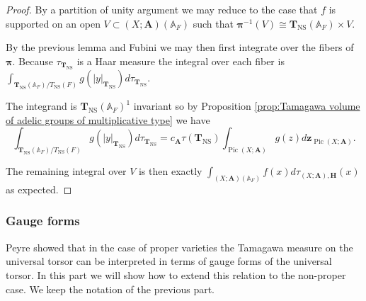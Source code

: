 \documentclass[a4paper,11pt,reqno]{amsart}
\newcommand{\A}{\mathbb{A}}
\DeclareMathOperator{\Pic}{Pic}
\DeclareMathOperator{\NS}{NS}
\theoremstyle{definition}
\begin{document}
\begin{proof}
	By a partition of unity argument we may reduce to the case that $f$ is supported on an open $V \subset (X ; \mathbf{A})(\A_F)$ such that $\bm{\pi}^{-1}(V) \cong \mathbf{T}_{\NS}(\A_F) \times V$. 
	
	By the previous lemma and Fubini we may then first integrate over the fibers of $\bm{\pi}$. Because $\tau_{\mathbf{T}_{\NS}}$ is a Haar measure the integral over each fiber is $\int_{\mathbf{T}_{\NS}(\A_F)/ T_{\NS}(F)} g(|y|_{\mathbf{T}_{\NS}}) d\tau_{\mathbf{T}_{\NS}}$.
	
	The integrand is $\mathbf{T}_{\NS}(\A_F)^1$ invariant so by Proposition \ref{prop:Tamagawa volume of adelic groups of multiplicative type} we have 
	\[
	\int_{\mathbf{T}_{\NS}(\A_F)/ T_{\NS}(F)} g(|y|_{\mathbf{T}_{\NS}}) d\tau_{\mathbf{T}_{\NS}} = c_{\mathbf{A}} \tau(\mathbf{T}_{\NS})\int_{\Pic(X ; \mathbf{A})} g(z) d \mathbf{z}_{\Pic(X ; \mathbf{A})}. 
	\]
	
	The remaining integral over $V$ is then exactly $\int_{(X ; \mathbf{A})(\A_F)} f(x) d\tau_{(X ; \mathbf{A}), \mathbf{H}}(x)$ as expected.
\end{proof}
\subsubsection{Gauge forms}
Peyre \cite[Lem.~3.1.14]{Peyre2001Torseur} showed that in the case of proper varieties the Tamagawa measure on the universal torsor can be interpreted in terms of gauge forms of the universal torsor. In this part we will show how to extend this relation to the non-proper case. We keep the notation of the previous part.
\end{document}
